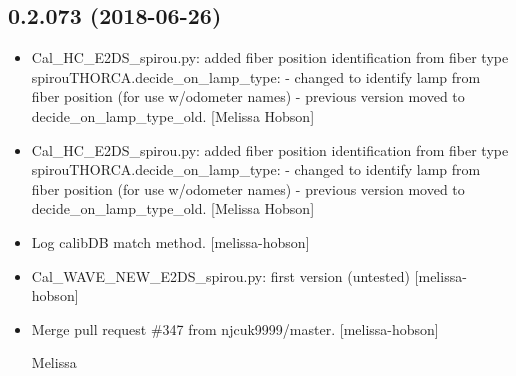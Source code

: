 \documentclass[a4paper,10pt,english]{report}
\begin{document}
\subsection{0.2.073 (2018-06-26)}
\label{\detokenize{misc/changelog:id409}}\begin{itemize}
\item {} 
Cal\_HC\_E2DS\_spirou.py: added fiber position identification from fiber
type spirouTHORCA.decide\_on\_lamp\_type: - changed to identify lamp from
fiber position (for use w/odometer names) - previous version moved to
decide\_on\_lamp\_type\_old. {[}Melissa Hobson{]}

\item {} 
Cal\_HC\_E2DS\_spirou.py: added fiber position identification from fiber
type spirouTHORCA.decide\_on\_lamp\_type: - changed to identify lamp from
fiber position (for use w/odometer names) - previous version moved to
decide\_on\_lamp\_type\_old. {[}Melissa Hobson{]}

\item {} 
Log calibDB match method. {[}melissa-hobson{]}

\item {} 
Cal\_WAVE\_NEW\_E2DS\_spirou.py: first version (untested) {[}melissa-hobson{]}

\item {} 
Merge pull request \#347 from njcuk9999/master. {[}melissa-hobson{]}

Melissa

\end{itemize}
\end{document}
